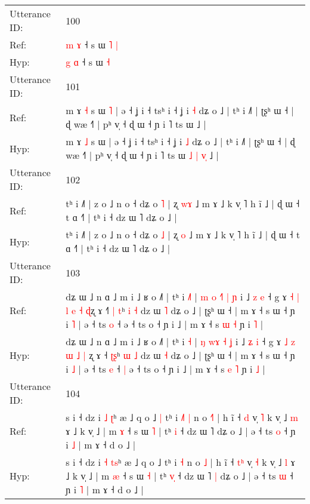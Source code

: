 \documentclass[10pt]{article}
\DeclareRobustCommand{\hl}[1]{{\textcolor{red}{#1}}}
\begin{document}
\begin{longtable}{ll}
Utterance ID: & 100 \\
Ref: & \hl{m} \hl{ɤ} ˧ s ɯ\hl{ }\hl{˥} \hl{|}
 \\
Hyp: & \hl{g} \hl{ɑ} ˧ s ɯ\hl{}\hl{} \hl{˧}
 \\
\midrule
Utterance ID: & 101 \\
Ref: & m ɤ \hl{˧} s ɯ\hl{ }\hl{˥} | ə ˧ ʝ i ˧ tsʰ i ˧ ʝ i \hl{˧} dʑ o ˩ | tʰ i ˩˥ | ʈʂʰ ɯ ˧ | ɖ wæ ˧˥ | pʰ v̩ ˧ ɖ ɯ ˧ ɲ i ˥ ts ɯ\hl{}\hl{}\hl{}\hl{}\hl{}\hl{}\hl{} ˩ |
 \\
Hyp: & m ɤ \hl{˩} s ɯ\hl{}\hl{} | ə ˧ ʝ i ˧ tsʰ i ˧ ʝ i \hl{˩} dʑ o ˩ | tʰ i ˩˥ | ʈʂʰ ɯ ˧ | ɖ wæ ˧˥ | pʰ v̩ ˧ ɖ ɯ ˧ ɲ i ˥ ts ɯ\hl{ }\hl{˩}\hl{ }\hl{|}\hl{ }\hl{v}\hl{̩} ˩ |
 \\
\midrule
Utterance ID: & 102 \\
Ref: & tʰ i ˩˥ | z o ˩ n o ˧ dʑ o \hl{˥} | ʐ \hl{w}\hl{ɤ} ˩ m ɤ ˩ k v̩ ˥ h ĩ ˩ | ɖ ɯ ˧ t ɑ ˧˥ | tʰ i ˧ dz ɯ ˥ dʑ o ˩ |
 \\
Hyp: & tʰ i ˩˥ | z o ˩ n o ˧ dʑ o \hl{˩} | ʐ \hl{}\hl{o} ˩ m ɤ ˩ k v̩ ˥ h ĩ ˩ | ɖ ɯ ˧ t ɑ ˧˥ | tʰ i ˧ dz ɯ ˥ dʑ o ˩ |
 \\
\midrule
Utterance ID: & 103 \\
Ref: & dʑ ɯ ˩ n ɑ ˩ m i ˩ ʁ o ˩˥ | tʰ i \hl{˩}\hl{˥} |\hl{ }\hl{m} \hl{o} \hl{˧}\hl{˥} \hl{|} \hl{ɲ} i ˩ \hl{z} \hl{e} ˧ g ɤ \hl{˧} \hl{|} \hl{l} \hl{e} \hl{˧} \hl{ɖ}ʐ ɤ ˧\hl{˥} \hl{|}\hl{ }\hl{t}ʰ \hl{i} \hl{˧} dz ɯ \hl{˥} dʑ o ˩ | ʈʂʰ ɯ ˧ | m ɤ ˧ s ɯ ˧ ɲ i \hl{˥} | ə ˧ ts \hl{o} ˧\hl{}\hl{} ə ˧ ts o ˧ ɲ i ˩ | m ɤ ˧ s \hl{ɯ} \hl{˧} ɲ i \hl{˥} |
 \\
Hyp: & dʑ ɯ ˩ n ɑ ˩ m i ˩ ʁ o ˩˥ | tʰ i \hl{}\hl{˧} |\hl{}\hl{} \hl{ŋ} \hl{w}\hl{ɤ} \hl{˧} \hl{ʝ} i ˩ \hl{ʑ} \hl{i} ˧ g ɤ \hl{˩} \hl{z} \hl{ɯ} \hl{˩} \hl{|} \hl{}ʐ ɤ ˧\hl{} \hl{}\hl{ʈ}\hl{ʂ}ʰ \hl{ɯ} \hl{˩} dz ɯ \hl{˧} dʑ o ˩ | ʈʂʰ ɯ ˧ | m ɤ ˧ s ɯ ˧ ɲ i \hl{˩} | ə ˧ ts \hl{e} ˧\hl{ }\hl{|} ə ˧ ts o ˧ ɲ i ˩ | m ɤ ˧ s \hl{e} \hl{˥} ɲ i \hl{˩} |
 \\
\midrule
Utterance ID: & 104 \\
Ref: & s i ˧ dz i \hl{˩} \hl{}\hl{ʈ}ʰ æ ˩ q o ˩\hl{ }\hl{|} tʰ i\hl{ }\hl{˩}\hl{˥} \hl{|} n o \hl{˧}\hl{˥} | h ĩ ˧ \hl{}\hl{d} v̩ \hl{˥} k v̩ ˩ \hl{m} ɤ ˩ k v̩ ˩ | m \hl{ɤ} ˧ s ɯ \hl{˥} | tʰ \hl{}\hl{i} ˧ dz ɯ ˥\hl{}\hl{} dʑ o ˩ | ə ˧ ts \hl{o} ˧ ɲ i \hl{˩} | m ɤ ˧ d o ˩ |
 \\
Hyp: & s i ˧ dz i \hl{˧} \hl{t}\hl{s}ʰ æ ˩ q o ˩\hl{}\hl{} tʰ i\hl{}\hl{}\hl{} \hl{˧} n o \hl{}\hl{˩} | h ĩ ˧ \hl{t}\hl{ʰ} v̩ \hl{˧} k v̩ ˩ \hl{l} ɤ ˩ k v̩ ˩ | m \hl{æ} ˧ s ɯ \hl{˧} | tʰ \hl{v}\hl{̩} ˧ dz ɯ ˥\hl{ }\hl{|} dʑ o ˩ | ə ˧ ts \hl{ɯ} ˧ ɲ i \hl{˥} | m ɤ ˧ d o ˩ |

\end{longtable}
\end{document}
